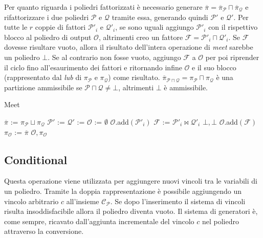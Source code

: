 \documentclass{mimosis}
\theoremstyle{definition}
\begin{document}
Per quanto riguarda i poliedri fattorizzati è necessario generare
\(\overline{\pi} = \overline{\pi}_{\mathcal{P}} \sqcap
\overline{\pi}_{\mathcal{Q}}\) e rifattorizzare i due poliedri \(\mathcal{P}\) e
\(\mathcal{Q}\) tramite essa, generando quindi \(\mathcal{P}'\) e \(\mathcal{Q}'\).
Per tutte le \(r\) coppie di fattori \(\mathcal{P}'_i\) e \(\mathcal{Q}'_i\), se
sono uguali aggiungo \(\mathcal{P}'_i\) con il rispettivo blocco al poliedro di
output \(\mathcal{O}\), altrimenti creo un fattore \(\mathcal{F} = \mathcal{P}'_i
\sqcap \mathcal{Q}'_i\). Se \(\mathcal{F}\) dovesse risultare vuoto, allora il
risultato dell'intera operazione di \emph{meet} sarebbe un poliedro \(\bot\). Se al
contrario non fosse vuoto, aggiungo \(\mathcal{F}\) a \(\mathcal{O}\) per poi
riprender il ciclo fino all'esaurimento dei fattori e ritornando infine
\(\mathcal{O}\) e il suo blocco (rappresentato dal \emph{lub} di \(\pi_{\mathcal{P}}\) e
\(\pi_{\mathcal{Q}}\)) come risultato. \(\overline{\pi}_{\mathcal{P} \sqcap
\mathcal{Q}} = \pi_{\mathcal{P}} \sqcap \pi_{\mathcal{Q}}\) è una partizione
ammissibile se \(\mathcal{P} \sqcap \mathcal{Q} \ne \bot\), altrimenti \(\bot\) è
ammissibile.

\begin{algorithm}[H]
\caption{Meet}\label{meet}
\begin{algorithmic}[1]
\State$\overline{\pi}$ := $\pi_{\mathcal{P}} \sqcup \pi_{\mathcal{Q}}$
\State$\mathcal{P}'$ := 
\State$\mathcal{Q}'$ := 
\State$\mathcal{O}$ := $\emptyset$
\State$\mathcal{O}$.add$(\mathcal{P}'_i)$
\Else
\State$\mathcal{F}$ := $\mathcal{P}'_{i} \bowtie \mathcal{Q}'_{i}$
\State\Return$\bot, \bot$
\EndIf
\State$\mathcal{O}$.add$(\mathcal{F})$
\EndIf
\EndFor
\State$\pi_{\mathcal{O}}$ := $\overline{\pi}$
\State\Return$\mathcal{O}, \pi_{\mathcal{O}}$
\EndFunction
\end{algorithmic}
\end{algorithm}


\subsection{Conditional}
\label{sec:orgf0d9f43}
Questa operazione viene utilizzata per aggiungere nuovi vincoli tra le variabili
di un poliedro. Tramite la doppia rappresentazione è possibile aggiungendo un
vincolo arbitrario \(c\) all'insieme \(\mathcal{C}_{\mathcal{P}}\). Se dopo
l'inserimento il sistema di vincoli risulta insoddisfacibile allora il poliedro
diventa vuoto. Il sistema di generatori è, come sempre, ricavato dall'aggiunta
incrementale del vincolo \(c\) nel poliedro attraverso la conversione.
\end{document}
